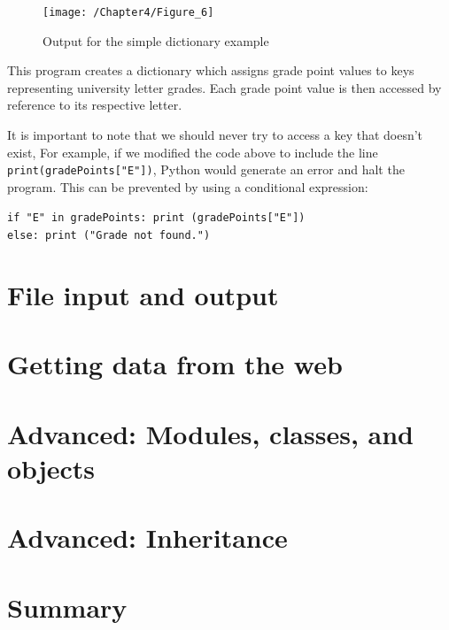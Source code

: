 \documentclass{book}
\begin{document}
\begin{figure}[h]
	\caption{Output for the simple dictionary example}
	\centering\texttt{[image: /Chapter4/Figure\_6]}
\end{figure}

This program creates a dictionary which assigns grade point values to keys representing university letter grades. Each grade point value is then accessed by reference to its respective letter. 

It is important to note that we should never try to access a key that doesn't exist,  For example, if we modified the code above to include the line \texttt{print(gradePoints["E"])}, Python would generate an error and halt the program. This can be prevented by using a conditional expression:

\texttt{if "E" in gradePoints: print (gradePoints["E"])}\\
\texttt{else: print ("Grade not found.")}

\section{File input and output}
\section{Getting data from the web}
\section{Advanced: Modules, classes, and objects}
\section{Advanced: Inheritance}
\section{Summary}
\end{document}

